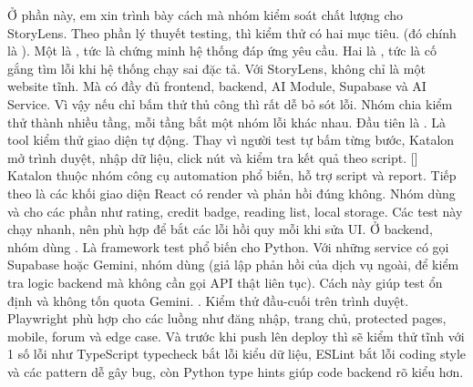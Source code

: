 \markdownRendererInterblockSeparator
{}Ở phần này, em xin trình bày cách mà nhóm kiểm soát chất lượng cho StoryLens.\markdownRendererParagraphSeparator
{}Theo phần lý thuyết testing, thì kiểm thử có hai mục tiêu. (đó chính là ).\markdownRendererInterblockSeparator
{}\markdownRendererUlBeginTight
\markdownRendererUlItem Một là , tức là chứng minh hệ thống đáp ứng yêu cầu.\markdownRendererUlItemEnd 
\markdownRendererUlItem Hai là , tức là cố gắng tìm lỗi khi hệ thống chạy sai đặc tả.\markdownRendererUlItemEnd 
\markdownRendererUlEndTight \markdownRendererInterblockSeparator
{}Với StoryLens, không chỉ là một website tĩnh. Mà có đầy đủ frontend, backend, AI Module, Supabase và AI Service. Vì vậy nếu chỉ bấm thử thủ công thì rất dễ bỏ sót lỗi. Nhóm chia kiểm thử thành nhiều tầng, mỗi tầng bắt một nhóm lỗi khác nhau.\markdownRendererParagraphSeparator
{}Đầu tiên là . Là tool kiểm thử giao diện tự động. Thay vì người test tự bấm từng bước, Katalon mở trình duyệt, nhập dữ liệu, click nút và kiểm tra kết quả theo script.\markdownRendererParagraphSeparator
{}[] Katalon thuộc nhóm công cụ automation phổ biến, hỗ trợ script và report.\markdownRendererParagraphSeparator
{}Tiếp theo là  các khối giao diện React có render và phản hồi đúng không. Nhóm dùng  và  cho các phần như rating, credit badge, reading list, local storage. Các test này chạy nhanh, nên phù hợp để bắt các lỗi hồi quy mỗi khi sửa UI.\markdownRendererParagraphSeparator
{}Ở backend, nhóm dùng . Là framework test phổ biến cho Python. Với những service có gọi Supabase hoặc Gemini, nhóm dùng  (giả lập phản hồi của dịch vụ ngoài, để kiểm tra logic backend mà không cần gọi API thật liên tục). Cách này giúp test ổn định và  không tốn quota Gemini.\markdownRendererParagraphSeparator
{}. Kiểm thử đầu-cuối trên trình duyệt. Playwright phù hợp cho các luồng như đăng nhập, trang chủ, protected pages, mobile, forum và edge case.\markdownRendererParagraphSeparator
{}Và trước khi push lên deploy thì sẽ kiểm thử tĩnh với 1 số lỗi như TypeScript typecheck bắt lỗi kiểu dữ liệu, ESLint bắt lỗi coding style và các pattern dễ gây bug, còn Python type hints giúp code backend rõ kiểu hơn.\markdownRendererParagraphSeparator
